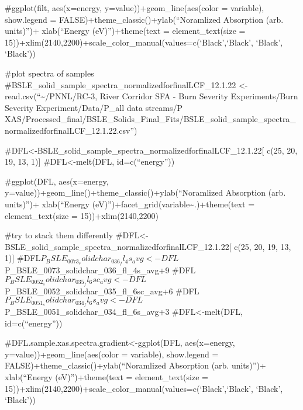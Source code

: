 \documentclass[
]{article}
\begin{document}
\#ggplot(filt, aes(x=energy, y=value))+geom\_line(aes(color = variable),
show.legend = FALSE)+theme\_classic()+ylab(``Noramlized Absorption (arb.
units)'')+ xlab(``Energy (eV)'')+theme(text = element\_text(size =
15))+xlim(2140,2200)+scale\_color\_manual(values=c(`Black',`Black',
`Black', `Black'))

\#plot spectra of samples
\#BSLE\_solid\_sample\_spectra\_normalizedforfinalLCF\_12.1.22
\textless- read.csv(``\textasciitilde/PNNL/RC-3, River Corridor SFA -
Burn Severity Experiments/Burn Severity Experiment/Data/P\_all data
streams/P
XAS/Processed\_final/BSLE\_Solids\_Final\_Fits/BSLE\_solid\_sample\_spectra\_normalizedforfinalLCF\_12.1.22.csv'')

\#DFL\textless-BSLE\_solid\_sample\_spectra\_normalizedforfinalLCF\_12.1.22{[}
c(25, 20, 19, 13, 1){]} \#DFL\textless-melt(DFL, id=c(``energy''))

\#ggplot(DFL, aes(x=energy,
y=value))+geom\_line()+theme\_classic()+ylab(``Noramlized Absorption
(arb. units)'')+ xlab(``Energy
(eV)'')+facet\_grid(variable\textasciitilde.)+theme(text =
element\_text(size = 15))+xlim(2140,2200)

\#try to stack them differently
\#DFL\textless-BSLE\_solid\_sample\_spectra\_normalizedforfinalLCF\_12.1.22{[}
c(25, 20, 19, 13, 1){]}
\#DFL\(P_BSLE_0073_solidchar_036_fl_4s_avg<-DFL\)P\_BSLE\_0073\_solidchar\_036\_fl\_4s\_avg+9
\#DFL\(P_BSLE_0052_solidchar_035_fl_6sc_avg<-DFL\)P\_BSLE\_0052\_solidchar\_035\_fl\_6sc\_avg+6
\#DFL\(P_BSLE_0051_solidchar_034_fl_6s_avg<-DFL\)P\_BSLE\_0051\_solidchar\_034\_fl\_6s\_avg+3
\#DFL\textless-melt(DFL, id=c(``energy''))

\#DFL.sample.xas.spectra.gradient\textless-ggplot(DFL, aes(x=energy,
y=value))+geom\_line(aes(color = variable), show.legend =
FALSE)+theme\_classic()+ylab(``Noramlized Absorption (arb. units)'')+
xlab(``Energy (eV)'')+theme(text = element\_text(size =
15))+xlim(2140,2200)+scale\_color\_manual(values=c(`Black',`Black',
`Black', `Black'))
\end{document}
